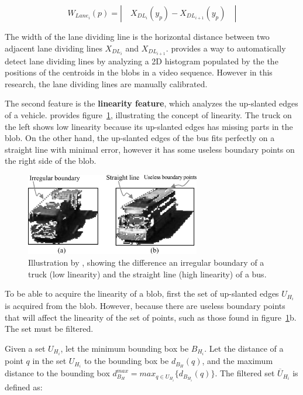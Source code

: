 \documentclass[conference]{IEEEtran}
\begin{document}
$$
W_{Lane_{i}}(p) = | \quad X_{DL_{i}}(y_p) - X_{DL_{i + 1}}(y_p) \quad |
$$

The width of the lane dividing line is the horizontal distance between two adjacent lane dividing lines $X_{DL_{i}}$ and $X_{DL_{i+1}}$. \cite{Jun-Wei} provides a way to automatically detect lane dividing lines by analyzing a 2D histogram populated by the the positions of the centroids in the blobs in a video sequence. However in this research, the lane dividing lines are manually calibrated. 

The second feature is the \textbf{linearity feature}, which analyzes the up-slanted edges of a vehicle. \cite{Jun-Wei} provides figure~\ref{fig_linearity}, illustrating the concept of linearity. The truck on the left shows low linearity because its up-slanted edges has missing parts in the blob. On the other hand, the up-slanted edges of the bus fits perfectly on a straight line with minimal error, however it has some useless boundary points on the right side of the blob.


\begin{figure}[!ht]
\centering
\includegraphics[width=3in]{linearity.png}
\caption{Illustration by \cite{Jun-Wei}, showing the difference an irregular boundary of a truck (low linearity) and the straight line (high linearity) of a bus.}
\label{fig_linearity}
\end{figure}

To be able to acquire the linearity of a blob, first the set of up-slanted edges $U_{H_i}$ is acquired from the blob. However, because there are useless boundary points that will affect the linearity of the set of points, such as those found in figure~\ref{fig_linearity}b. The set must be filtered.

Given a set $U_{H_i}$, let the minimum bounding box be $B_{H_i}$. Let the distance of a point $q$ in the set $U_{H_i}$ to the bounding box be $d_{B_H} (q)$, and the maximum distance to the bounding box $d_{B_H}^{max} = max_{q \in U_{H_i}} \lbrace d_{B_{H_i}} (q) \rbrace $. The filtered set $\overline{U}_{H_i}$ is defined as:
\end{document}
